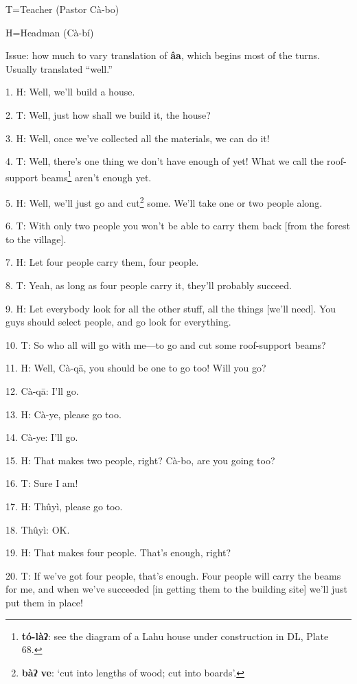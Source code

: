 \setcounter{footnote}{0}

T=Teacher (Pastor Cà-bo)

H=Headman (Cà-bí)

Issue: how much to vary translation of \textbf{âa}, which begins most of the turns. Usually
translated ``well.''

1. H: Well, we'll build a house.

2. T: Well, just how shall we build it, the house?

3. H: Well, once we've collected all the materials, we can do it!

4. T: Well, there's one thing we don't have enough of yet! What we call the roof-support
beams\footnote{\textbf{tó-làʔ}: see the diagram of a Lahu house under construction in DL, Plate 68.} aren't enough yet.

5. H: Well, we'll just go and cut\footnote{\textbf{bàʔ} \textbf{ve}: `cut into lengths of wood; cut into boards'.} some. We'll take one or two people along.

6. T: With only two people you won't be able to carry them back [from the forest
to the village].

7. H: Let four people carry them, four people.

8. T: Yeah, as long as four people carry it, they'll probably succeed.

9. H: Let everybody look for all the other stuff, all the things [we'll need].
You guys should select people, and go look for everything.

10. T: So who all will go with me---to go and cut some roof-support beams?

11. H: Well, Cà-qā, you should be one to go too! Will you go?

12. Cà-qā: I'll go.

13. H: Cà-ye, please go too.

14. Cà-ye: I'll go.

15. H: That makes two people, right? Cà-bo, are you going too?

16. T: Sure I am!

17. H: Thûyì, please go too.

18. Thûyì: OK.

19. H: That makes four people. That's enough, right?

20. T: If we've got four people, that's enough. Four people will carry the beams
for me, and when we've succeeded [in getting them to the building site] we'll just
put them in place!

